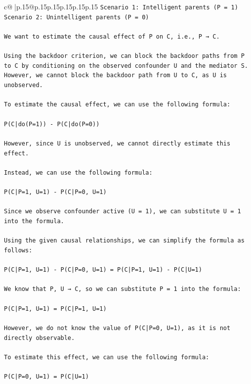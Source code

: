 \documentclass{article}
\begin{document}
{\begin{supertabular}{c@{$\;$}|p{.15\linewidth}@{}p{.15\linewidth}p{.15\linewidth}p{.15\linewidth}p{.15\linewidth}p{.15\linewidth}}
{{{\texttt{Scenario 1: Intelligent parents (P = 1)} \\
\texttt{Scenario 2: Unintelligent parents (P = 0)} \\
\\ 
\texttt{We want to estimate the causal effect of P on C, i.e., P → C.} \\
\\ 
\texttt{Using the backdoor criterion, we can block the backdoor paths from P to C by conditioning on the observed confounder U and the mediator S. However, we cannot block the backdoor path from U to C, as U is unobserved.} \\
\\ 
\texttt{To estimate the causal effect, we can use the following formula:} \\
\\ 
\texttt{P(C|do(P=1)) {-} P(C|do(P=0))} \\
\\ 
\texttt{However, since U is unobserved, we cannot directly estimate this effect.} \\
\\ 
\texttt{Instead, we can use the following formula:} \\
\\ 
\texttt{P(C|P=1, U=1) {-} P(C|P=0, U=1)} \\
\\ 
\texttt{Since we observe confounder active (U = 1), we can substitute U = 1 into the formula.} \\
\\ 
\texttt{Using the given causal relationships, we can simplify the formula as follows:} \\
\\ 
\texttt{P(C|P=1, U=1) {-} P(C|P=0, U=1) = P(C|P=1, U=1) {-} P(C|U=1)} \\
\\ 
\texttt{We know that P, U → C, so we can substitute P = 1 into the formula:} \\
\\ 
\texttt{P(C|P=1, U=1) = P(C|P=1, U=1)} \\
\\ 
\texttt{However, we do not know the value of P(C|P=0, U=1), as it is not directly observable.} \\
\\ 
\texttt{To estimate this effect, we can use the following formula:} \\
\\ 
\texttt{P(C|P=0, U=1) = P(C|U=1)} \\
}}}
\end{supertabular}}
\end{document}
